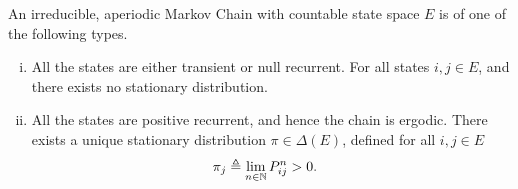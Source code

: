 \documentclass[a4paper,10pt,english]{article}
\begin{document}
\begin{thm}
An irreducible, aperiodic Markov Chain with countable state space $E$ is of one of the following types. 
\begin{enumerate}[i)]
\item All the states are either transient or null recurrent. 
For all states $i, j \in E$,
and there exists no stationary distribution.
\item All the states are positive recurrent, and hence the chain is ergodic. 
There exists a unique stationary distribution $\pi \in \Delta(E)$, defined for all $i,j \in E$
\begin{align*}
 \pi_j &\triangleq \lim_{n \in \mathbb{N}} P^n_{ij} > 0.
 \end{align*}
\end{enumerate}
\end{thm}
\end{document}
